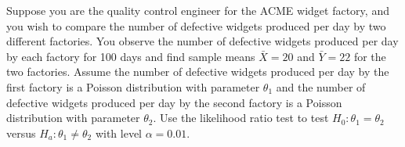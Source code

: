 \documentclass[notes.tex]{subfiles}
\begin{document}
\begin{example}
Suppose you are the quality control engineer for the ACME widget factory, and you wish to compare the number of defective widgets produced per day by two different factories. You observe the number of defective widgets produced per day by each factory for 100 days and find sample means $\bar{X} = 20$ and $\bar{Y} = 22$ for the two factories. Assume the number of defective widgets produced per day by the first factory is a Poisson distribution with parameter $\theta_1$ and the number of defective widgets produced per day by the second factory is a Poisson distribution with parameter $\theta_2$. Use the likelihood ratio test to test $H_0: \theta_1 = \theta_2$ versus $H_a: \theta_1 \neq \theta_2$ with level $\alpha = 0.01$.\\


\end{example}
\end{document}
